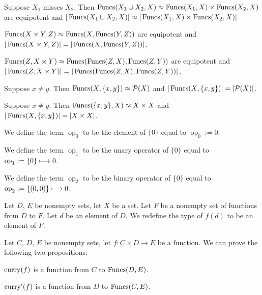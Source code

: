 \documentclass{article}
\begin{document}
\begin{thm}
\item\label{funct5:62} Suppose $X_{1}$ misses $X_{2}$.
  Then $\operatorname{Funcs}(X_{1}\cup X_{2},X)\approx\operatorname{Funcs}(X_{1},X)\times\operatorname{Funcs}(X_{2},X)$
  are equipotent and
  $|\operatorname{Funcs}(X_{1}\cup X_{2},X)|\approx|\operatorname{Funcs}(X_{1},X)\times\operatorname{Funcs}(X_{2},X)|$
\item\label{funct5:63} $\operatorname{Funcs}(X\times Y,Z)\approx\operatorname{Funcs}(X,\operatorname{Funcs}(Y,Z))$ are equipotent and
  $|\operatorname{Funcs}(X\times Y,Z)|=|\operatorname{Funcs}(X,\operatorname{Funcs}(Y,Z))|$.
\item\label{funct5:64} $\operatorname{Funcs}(Z,X\times Y)\approx\operatorname{Funcs}(\operatorname{Funcs}(Z,X),\operatorname{Funcs}(Z,Y))$ are equipotent and
  $|\operatorname{Funcs}(Z,X\times Y)|=|\operatorname{Funcs}(\operatorname{Funcs}(Z,X),\operatorname{Funcs}(Z,Y))|$.
\item\label{funct5:65} Suppose $x\neq y$.
  Then $\operatorname{Funcs}(X,\{x,y\})\approx\mathcal{P}(X)$ and $|\operatorname{Funcs}(X,\{x,y\})|=|\mathcal{P}(X)|$.
\item\label{funct5:66} Suppose $x\neq y$.
  Then $\operatorname{Funcs}(\{x,y\},X)\approx X\times X$ and
  $|\operatorname{Funcs}(X,\{x,y\})|=|X\times X|$.
\end{thm}

\begin{definition}
We define the term $\operatorname{op}_{0}$ to be the element of $\{0\}$
equal to $\operatorname{op}_{0}:=0$.
\end{definition}
\begin{definition}
We define the term $\operatorname{op}_{1}$ to be the unary operator of $\{0\}$
equal to $\operatorname{op}_{1}:=\{0\}\longmapsto0$.
\end{definition}
\begin{definition}
We define the term $\operatorname{op}_{2}$ to be the binary operator of $\{0\}$
equal to $\operatorname{op}_{2}:=\{(0,0)\}\longmapsto0$.
\end{definition}

\begin{definition}
Let $D$, $E$ be nonempty sets, let $X$ be a set.
Let $F$ be a nonempty set of functions from $D$ to $F$.
Let $d$ be an element of $D$.
We redefine the type of $f(d)$ to be an element of $F$.
\end{definition}

Let $C$, $D$, $E$ be nonempty sets, let $f\colon C\times D\to E$ be a
function. We can prove the following two propositions:
\begin{thm}
\item\label{funct5:67} $\operatorname{curry}(f)$ is a function from $C$ to $\operatorname{Funcs}(D,E)$.
\item\label{funct5:68} $\operatorname{curry}'(f)$ is a function from $D$ to $\operatorname{Funcs}(C,E)$.
\end{thm}
\end{document}
